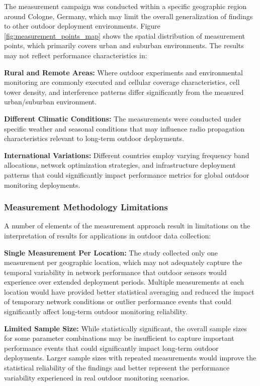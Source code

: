 \documentclass[12pt, english, openany]{book}
\begin{document}
The measurement campaign was conducted within a specific geographic region around Cologne, Germany, which may limit the overall generalization of findings to other outdoor deployment environments. Figure \ref{fig:measurement_points_map} shows the spatial distribution of measurement points, which primarily covers urban and suburban environments. The results may not reflect performance characteristics in:

\textbf{Rural and Remote Areas:} Where outdoor experiments and environmental monitoring are commonly executed and cellular coverage characteristics, cell tower density, and interference patterns differ significantly from the measured urban/suburban environment.

\textbf{Different Climatic Conditions:} The measurements were conducted under specific weather and seasonal conditions that may influence radio propagation characteristics relevant to long-term outdoor deployments.

\textbf{International Variations:} Different countries employ varying frequency band allocations, network optimization strategies, and infrastructure deployment patterns that could significantly impact performance metrics for global outdoor monitoring deployments.

\subsubsection*{Measurement Methodology Limitations}

A number of elements of the measurement approach result in limitations on the interpretation of results for applications in outdoor data collection:

\textbf{Single Measurement Per Location:} The study collected only one measurement per geographic location, which may not adequately capture the temporal variability in network performance that outdoor sensors would experience over extended deployment periods. Multiple measurements at each location would have provided better statistical averaging and reduced the impact of temporary network conditions or outlier performance events that could significantly affect long-term outdoor monitoring reliability.

\textbf{Limited Sample Size:} While statistically significant, the overall sample sizes for some parameter combinations may be insufficient to capture important performance events that could significantly impact long-term outdoor deployments. Larger sample sizes with repeated measurements would improve the statistical reliability of the findings and better represent the performance variability experienced in real outdoor monitoring scenarios.
\end{document}
